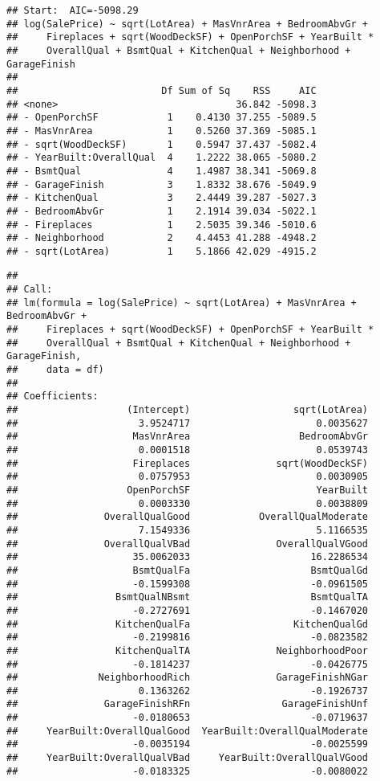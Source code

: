 \documentclass[
]{article}
\begin{document}
\begin{verbatim}
## Start:  AIC=-5098.29
## log(SalePrice) ~ sqrt(LotArea) + MasVnrArea + BedroomAbvGr + 
##     Fireplaces + sqrt(WoodDeckSF) + OpenPorchSF + YearBuilt * 
##     OverallQual + BsmtQual + KitchenQual + Neighborhood + GarageFinish
## 
##                         Df Sum of Sq    RSS     AIC
## <none>                               36.842 -5098.3
## - OpenPorchSF            1    0.4130 37.255 -5089.5
## - MasVnrArea             1    0.5260 37.369 -5085.1
## - sqrt(WoodDeckSF)       1    0.5947 37.437 -5082.4
## - YearBuilt:OverallQual  4    1.2222 38.065 -5080.2
## - BsmtQual               4    1.4987 38.341 -5069.8
## - GarageFinish           3    1.8332 38.676 -5049.9
## - KitchenQual            3    2.4449 39.287 -5027.3
## - BedroomAbvGr           1    2.1914 39.034 -5022.1
## - Fireplaces             1    2.5035 39.346 -5010.6
## - Neighborhood           2    4.4453 41.288 -4948.2
## - sqrt(LotArea)          1    5.1866 42.029 -4915.2
\end{verbatim}

\begin{verbatim}
## 
## Call:
## lm(formula = log(SalePrice) ~ sqrt(LotArea) + MasVnrArea + BedroomAbvGr + 
##     Fireplaces + sqrt(WoodDeckSF) + OpenPorchSF + YearBuilt * 
##     OverallQual + BsmtQual + KitchenQual + Neighborhood + GarageFinish, 
##     data = df)
## 
## Coefficients:
##                   (Intercept)                  sqrt(LotArea)  
##                     3.9524717                      0.0035627  
##                    MasVnrArea                   BedroomAbvGr  
##                     0.0001518                      0.0539743  
##                    Fireplaces               sqrt(WoodDeckSF)  
##                     0.0757953                      0.0030905  
##                   OpenPorchSF                      YearBuilt  
##                     0.0003330                      0.0038809  
##               OverallQualGood            OverallQualModerate  
##                     7.1549336                      5.1166535  
##               OverallQualVBad               OverallQualVGood  
##                    35.0062033                     16.2286534  
##                    BsmtQualFa                     BsmtQualGd  
##                    -0.1599308                     -0.0961505  
##                 BsmtQualNBsmt                     BsmtQualTA  
##                    -0.2727691                     -0.1467020  
##                 KitchenQualFa                  KitchenQualGd  
##                    -0.2199816                     -0.0823582  
##                 KitchenQualTA               NeighborhoodPoor  
##                    -0.1814237                     -0.0426775  
##              NeighborhoodRich               GarageFinishNGar  
##                     0.1363262                     -0.1926737  
##               GarageFinishRFn                GarageFinishUnf  
##                    -0.0180653                     -0.0719637  
##     YearBuilt:OverallQualGood  YearBuilt:OverallQualModerate  
##                    -0.0035194                     -0.0025599  
##     YearBuilt:OverallQualVBad     YearBuilt:OverallQualVGood  
##                    -0.0183325                     -0.0080022
\end{verbatim}
\end{document}
